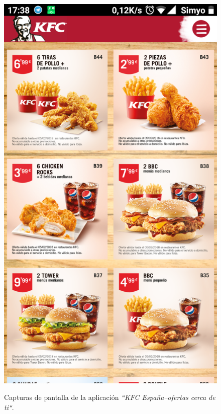 \documentclass[twoside]{report}
\begin{document}
\begin{figure}[H]
\begin{center}
\includegraphics[scale=0.25]{images/restaurantes/kfc1.png}
\caption{Capturas de pantalla de la aplicación \textit{“KFC España–ofertas cerca de ti“}.} \cite{kfcapp}
\end{center}
\end{figure}
\end{document}
